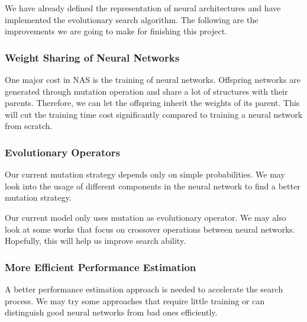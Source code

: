 \documentclass[conference]{IEEEtran}
\begin{document}
 We have already defined the representation of neural architectures and have implemented the evolutionary search algorithm. The following are the improvements we are going to make for finishing this project.
 
  
  \subsubsection{Weight Sharing of Neural Networks}    
  One major cost in NAS is the training of neural networks. Offspring networks are generated through mutation operation and share a lot of structures with their parents. Therefore, we can let the offspring inherit the weights of its parent. This will cut the training time cost significantly compared to training a neural network from scratch.
  
  \subsubsection{Evolutionary Operators}
  Our current mutation strategy depends only on simple probabilities. We may look into the usage of different components in the neural network to find a better mutation strategy.

  Our current model only uses mutation as evolutionary operator. We may also look at some works that focus on crossover operations between neural networks. Hopefully, this will help us improve search ability.

  \subsubsection{More Efficient Performance Estimation}
  A better performance estimation approach is needed to accelerate the search process. We may try some approaches that require little training or can distinguish good neural networks from bad ones efficiently.
   



\end{document}
